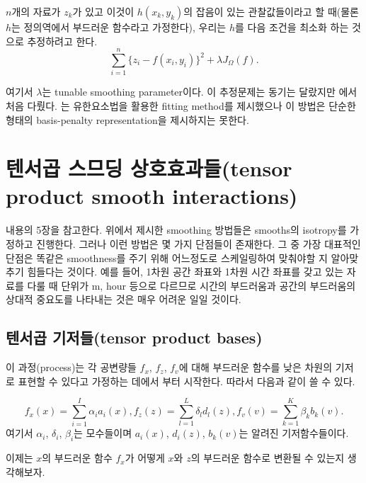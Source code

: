 \documentclass[b5paper,]{scrbook}
\theoremstyle{plain}
\theoremstyle{definition}
\numberwithin{equation}{section}
\begin{document}
\(n\)개의 자료가 \(z_{k}\)가 있고 이것이 \(h(x_{k},y_{k})\)의 잡음이 있는 관찰값들이라고 할 때(물론 \(h\)는 정의역에서 부드러운 함수라고 가정한다), 우리는 \(h\)를 다음 조건을 최소화 하는 것으로 추정하려고 한다.
\begin{equation}
\sum_{i=1}^{n}\{ z_{i}-f(x_{i},y_{i})\}^{2}+\lambda J_{\Omega}(f).
\label{eq:soapfilmsmoothing}
\end{equation}

여기서 \(\lambda\)는 tunable smoothing parameter이다. 이 추정문제는 동기는 달랐지만 \citep{Ramsay2002}에서 처음 다뤘다. \citep{Ramsay2002}는 유한요소법을 활용한 fitting method를 제시했으나 이 방법은 단순한 형태의 basis-penalty representation을 제시하지는 못한다.

\hypertarget{--tensor-product-smooth-interactions}{%
\section{텐서곱 스므딩 상호효과들(tensor product smooth interactions)}\label{--tensor-product-smooth-interactions}}

\citep{Wood2006} 내용의 5장을 참고한다. 위에서 제시한 smoothing 방법들은 smooths의 isotropy를 가정하고 진행한다. 그러나 이런 방법은 몇 가지 단점들이 존재한다. 그 중 가장 대표적인 단점은 똑같은 smoothness를 주기 위해 어느정도로 스케일링하여 맞춰야할 지 알아맞추기 힘들다는 것이다. 예를 들어, 1차원 공간 좌표와 1차원 시간 좌표를 갖고 있는 자료를 다룰 때 단위가 m, hour 등으로 다르므로 시간의 부드러움과 공간의 부드러움의 상대적 중요도를 나타내는 것은 매우 어려운 일일 것이다.

\hypertarget{-tensor-product-bases}{%
\subsection{텐서곱 기저들(tensor product bases)}\label{-tensor-product-bases}}

이 과정(process)는 각 공변량들 \(f_{x}\), \(f_{z}\), \(f_{v}\)에 대해 부드러운 함수를 낮은 차원의 기저로 표현할 수 있다고 가정하는 데에서 부터 시작한다. 따라서 다음과 같이 쓸 수 있다.

\[f_{x}(x)=\sum_{i=1}^{I}\alpha_{i}a_{i}(x), f_{z}(z)=\sum_{l=1}^{L}\delta_{l}d_{l}(z), f_{v}(v)=\sum_{k=1}^{K}\beta_{k}b_{k}(v).\]
여기서 \(\alpha_{i}\), \(\delta_{i}\), \(\beta_{i}\)는 모수들이며 \(a_{i}(x)\), \(d_{i}(z)\), \(b_{k}(v)\)는 알려진 기저함수들이다.

이제는 \(x\)의 부드러운 함수 \(f_{x}\)가 어떻게 \(x\)와 \(z\)의 부드러운 함수로 변환될 수 있는지 생각해보자.
\end{document}
